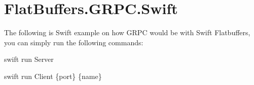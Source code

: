 \chapter{Flat\+Buffers.\+GRPC.\+Swift}
\hypertarget{md_flatbuffers_2grpc_2examples_2swift_2Greeter_2README}{}\label{md_flatbuffers_2grpc_2examples_2swift_2Greeter_2README}
The following is Swift example on how GRPC would be with Swift Flatbuffers, you can simply run the following commands\+:

{\ttfamily swift run Server}

{\ttfamily swift run Client \{port\} \{name\}} 